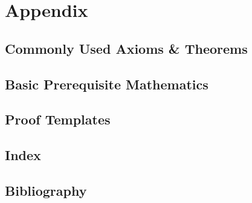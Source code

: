 \documentclass[11pt,fleqn,dvipsnames]{book} %
\begin{document}
\part*{Appendix}
\appendix
\chapter*{Commonly Used Axioms \& Theorems}

\renewcommand{\leftmark}{\sffamily\bfseries Axioms \& Theorems}
\renewcommand{\rightmark}{\sffamily\bfseries Axioms \& Theorems}



\chapter*{Basic Prerequisite Mathematics}


\chapter*{Proof Templates}



\chapter*{Index}
\renewcommand{\leftmark}{\sffamily\bfseries Index}
\renewcommand{\rightmark}{\sffamily\bfseries Index}
\setlength{\columnsep}{0.75cm} %

\printindex %

\chapter*{Bibliography}
\renewcommand{\leftmark}{\sffamily\bfseries Bibliography}
\renewcommand{\rightmark}{\sffamily\bfseries Bibliography}
\end{document}
